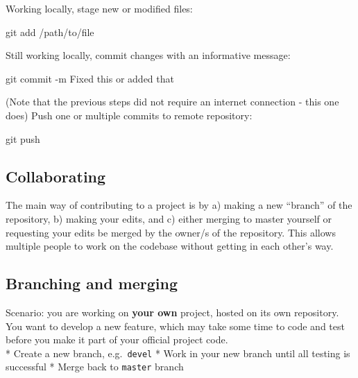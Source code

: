 \documentclass[
]{book}
\newenvironment{Shaded}{\begin{snugshade}}{\end{snugshade}}
\newcommand{\FunctionTok}[1]{\textcolor[rgb]{0.00,0.00,0.00}{#1}}
\newcommand{\NormalTok}[1]{#1}
\begin{document}
Working locally, stage new or modified files:

\begin{Shaded}
\begin{Highlighting}[]
\FunctionTok{git}\NormalTok{ add /path/to/file}
\end{Highlighting}
\end{Shaded}

Still working locally, commit changes with an informative message:

\begin{Shaded}
\begin{Highlighting}[]
\FunctionTok{git}\NormalTok{ commit {-}m Fixed this or added that}
\end{Highlighting}
\end{Shaded}

(Note that the previous steps did not require an internet connection - this one does)
Push one or multiple commits to remote repository:

\begin{Shaded}
\begin{Highlighting}[]
\FunctionTok{git}\NormalTok{ push}
\end{Highlighting}
\end{Shaded}

\hypertarget{collaborating}{%
\subsection{Collaborating}\label{collaborating}}

The main way of contributing to a project is by a) making a new ``branch'' of the repository, b) making your edits, and c) either merging to master yourself or requesting your edits be merged by the owner/s of the repository.
This allows multiple people to work on the codebase without getting in each other's way.

\hypertarget{branching-and-merging}{%
\subsection{Branching and merging}\label{branching-and-merging}}

Scenario: you are working on \textbf{your own} project, hosted on its own repository. You want to develop a new feature, which may take some time to code and test before you make it part of your official project code.\\
* Create a new branch, e.g.~\texttt{devel}
* Work in your new branch until all testing is successful
* Merge back to \texttt{master} branch
\end{document}
